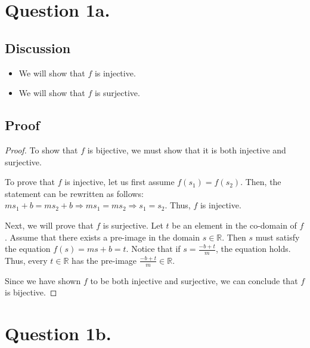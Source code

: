 \documentclass{article}
\begin{document}
\section*{Question 1a.}
\subsection*{Discussion}
\begin{itemize}
    \item We will show that $ f $ is injective.
    \item We will show that $ f $ is surjective.
\end{itemize}

\subsection*{Proof}
\begin{proof}
    To show that $ f $ is bijective, we must show that it is both injective and surjective.

    \noindent To prove that $ f $ is injective, let us first assume $ f(s_1) = f(s_2) $. Then, the statement can be rewritten as follows: $ ms_1 + b = ms_2 + b \Rightarrow ms_1 = ms_2 \Rightarrow s_1 = s_2 $.
    Thus, $ f $ is injective.

    \noindent Next, we will prove that $ f $ is surjective. Let $ t $ be an element in the co-domain of $ f $. Assume that there exists a pre-image in the domain $ s \in \mathbb{R} $. Then $ s $ must satisfy the equation
    $ f(s) = ms + b = t $. Notice that if $ s = \frac{-b + t}{m} $, the equation holds. Thus, every $ t \in \mathbb{R} $ has the pre-image $ \frac{-b + t}{m} \in \mathbb{R} $.

    \noindent Since we have shown $ f $ to be both injective and surjective, we can conclude that $ f $ is bijective.
\end{proof}

\section*{Question 1b.}
\end{document}
